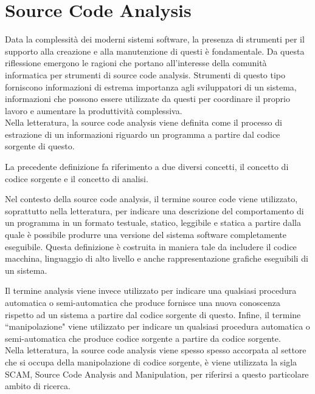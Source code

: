 \section{Source Code Analysis}

Data la complessità dei moderni sistemi software, la presenza di strumenti per
il supporto alla creazione e alla manutenzione di questi è fondamentale. Da
questa riflessione emergono le ragioni che portano all’interesse della comunità
informatica per strumenti di source code analysis. Strumenti di questo tipo
forniscono informazioni di estrema importanza agli sviluppatori di un sistema,
informazioni che possono essere utilizzate da questi per coordinare il proprio
lavoro e aumentare la produttività complessiva.\\

Nella letteratura, la source code analysis viene definita come il processo di
estrazione di un informazioni riguardo un programma a partire dal codice
sorgente di questo.

La precedente definizione fa riferimento a due diversi concetti, il concetto di
codice sorgente e il concetto di analisi.

Nel contesto della source code analysis, il termine source code viene
utilizzato, soprattutto nella letteratura, per indicare una descrizione del
comportamento di un programma in un formato testuale, statico, leggibile e
statica a partire dalla quale è possibile produrre una versione del sistema
software completamente eseguibile. Questa definizione è costruita in maniera
tale da includere il codice macchina, linguaggio di alto livello e anche
rappresentazione grafiche eseguibili di un sistema.

Il termine analysis viene invece utilizzato per indicare una qualsiasi
procedura automatica o semi-automatica che produce fornisce una nuova
conoscenza rispetto ad un sistema a partire dal codice sorgente di questo.
Infine, il termine “manipolazione" viene utilizzato per indicare un qualsiasi
procedura automatica o semi-automatica che produce codice sorgente a partire da
codice sorgente. \cite{DBLP:journals/jss/DeanHKV06}
\cite{DBLP:conf/icse/Binkley07}\\

Nella letteratura, la source code analysis viene spesso spesso accorpata al
settore che si occupa della manipolazione di codice sorgente, è viene utilizzata
la sigla SCAM, Source Code Analysis and Manipulation, per riferirsi a questo
particolare ambito di ricerca. \cite{DBLP:conf/scam/2001}\\

